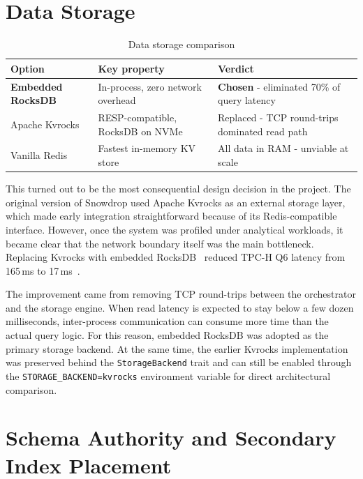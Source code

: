 \section{Data Storage}

\begin{table}[H]
\centering
\caption{Data storage comparison}
\label{tab:storage-comparison}
\renewcommand{\arraystretch}{1.4}
\begin{tabular}{|l|p{3.5cm}|p{5.5cm}|}
\hline
\textbf{Option} & \textbf{Key property} & \textbf{Verdict} \\
\hline
\textbf{Embedded RocksDB} & In-process, zero network overhead & \textbf{Chosen} - eliminated 70\% of query latency \\
\hline
Apache Kvrocks & RESP-compatible, RocksDB on NVMe & Replaced - TCP round-trips dominated read path~\cite{kvrocks2025} \\
\hline
Vanilla Redis & Fastest in-memory KV store & All data in RAM - unviable at scale \\
\hline
\end{tabular}
\end{table}

This turned out to be the most consequential design decision in the project. The original version of Snowdrop used Apache Kvrocks as an external storage layer, which made early integration straightforward because of its Redis-compatible interface. However, once the system was profiled under analytical workloads, it became clear that the network boundary itself was the main bottleneck. Replacing Kvrocks with embedded RocksDB~\cite{matsunobu2020} reduced TPC-H Q6 latency from 165\,ms to 17\,ms~\cite{luo2020}.

The improvement came from removing TCP round-trips between the orchestrator and the storage engine. When read latency is expected to stay below a few dozen milliseconds, inter-process communication can consume more time than the actual query logic. For this reason, embedded RocksDB was adopted as the primary storage backend. At the same time, the earlier Kvrocks implementation was preserved behind the \texttt{StorageBackend} trait and can still be enabled through the \texttt{STORAGE\_BACKEND=kvrocks} environment variable for direct architectural comparison.

\section{Schema Authority and Secondary Index Placement}

